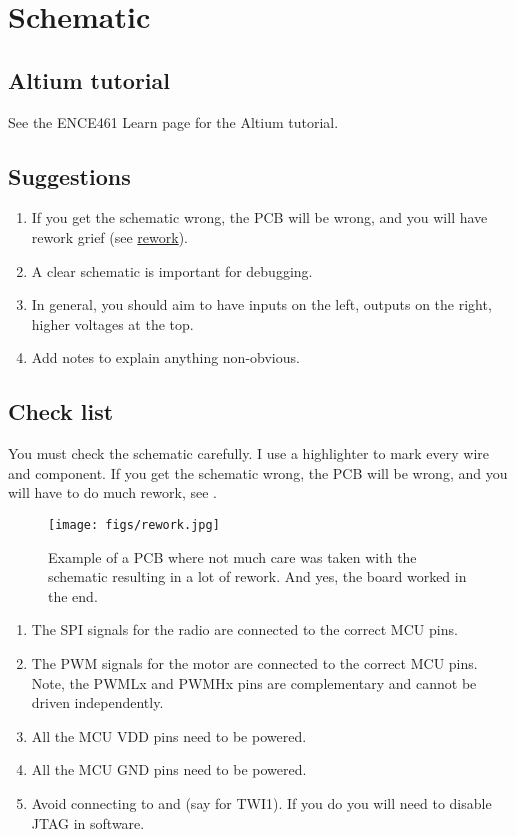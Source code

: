 \chapter{Schematic}


\section{Altium tutorial}


See the ENCE461 Learn page for the Altium tutorial.


\section{Suggestions}

\begin{enumerate}
\item If you get the schematic wrong, the PCB will be wrong, and you
  will have rework grief (see \hyperref[rework]{rework}).

\item A clear schematic is important for debugging.

\item In general, you should aim to have inputs on the left, outputs
  on the right, higher voltages at the top.

\item Add notes to explain anything non-obvious.
\end{enumerate}



\section{Check list}
\label{PCB-check-list}

You must check the schematic carefully.  I use a highlighter to mark
every wire and component.  If you get the schematic wrong, the PCB
will be wrong, and you will have to do much rework, see
.


\begin{figure}[!h]
  \centering
  \texttt{[image: figs/rework.jpg]}
  \caption{Example of a PCB where not much care was taken with the
    schematic resulting in a lot of rework.  And yes, the board worked
    in the end.}
  \label{fig:rework}
\end{figure}



\begin{enumerate}
\item
  The SPI signals for the radio are connected to the correct MCU pins.
\item
  The PWM signals for the motor are connected to the correct MCU pins.
  Note, the PWMLx and PWMHx pins are complementary and cannot be driven
  independently.
\item
  All the MCU VDD pins need to be powered.
\item
  All the MCU GND pins need to be powered.
\item
  Avoid connecting to  and  (say for TWI1).  If you
  do you will need to disable JTAG in software.
\end{enumerate}
